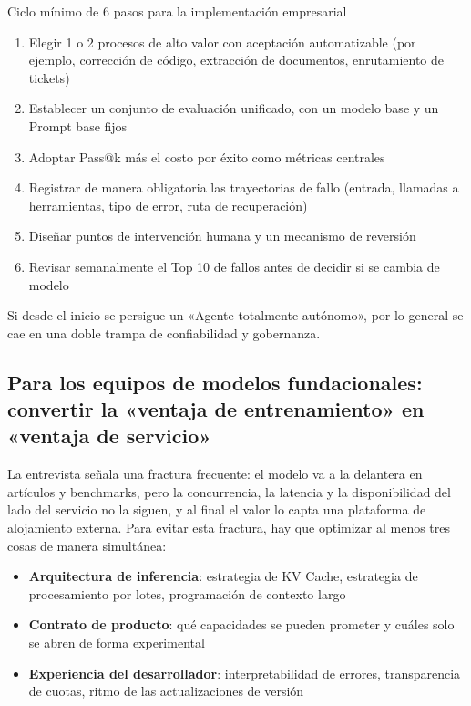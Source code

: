 \documentclass[a4paper]{article}
\begin{document}
\begin{importantbox}{Ciclo mínimo de 6 pasos para la implementación empresarial}
\begin{enumerate}
    \item Elegir 1 o 2 procesos de alto valor con aceptación automatizable (por ejemplo, corrección de código, extracción de documentos, enrutamiento de tickets)
    \item Establecer un conjunto de evaluación unificado, con un modelo base y un Prompt base fijos
    \item Adoptar Pass@k más el costo por éxito como métricas centrales
    \item Registrar de manera obligatoria las trayectorias de fallo (entrada, llamadas a herramientas, tipo de error, ruta de recuperación)
    \item Diseñar puntos de intervención humana y un mecanismo de reversión
    \item Revisar semanalmente el Top 10 de fallos antes de decidir si se cambia de modelo
\end{enumerate}

Si desde el inicio se persigue un «Agente totalmente autónomo», por lo general se cae en una doble trampa de confiabilidad y gobernanza.
\end{importantbox}

\subsection{Para los equipos de modelos fundacionales: convertir la «ventaja de entrenamiento» en «ventaja de servicio»}

La entrevista señala una fractura frecuente: el modelo va a la delantera en artículos y benchmarks, pero la concurrencia, la latencia y la disponibilidad del lado del servicio no la siguen, y al final el valor lo capta una plataforma de alojamiento externa. Para evitar esta fractura, hay que optimizar al menos tres cosas de manera simultánea:
\begin{itemize}
    \item \textbf{Arquitectura de inferencia}: estrategia de KV Cache, estrategia de procesamiento por lotes, programación de contexto largo
    \item \textbf{Contrato de producto}: qué capacidades se pueden prometer y cuáles solo se abren de forma experimental
    \item \textbf{Experiencia del desarrollador}: interpretabilidad de errores, transparencia de cuotas, ritmo de las actualizaciones de versión
\end{itemize}
\end{document}
